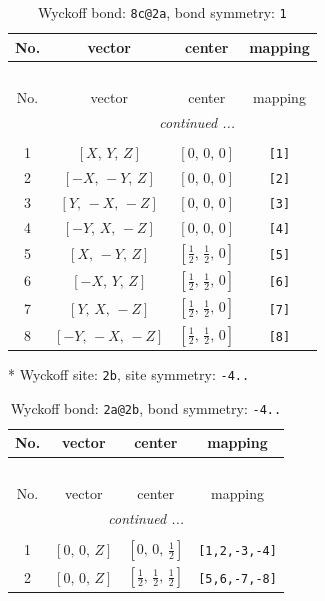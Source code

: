 \documentclass[fleqn,8pt]{jsarticle}
\begin{document}
\renewcommand{\arraystretch}{1.2}
\begin{longtable}{cccc}
\caption{Wyckoff bond: {\tt 8c@2a}, bond symmetry: {\tt 1}}
 \\
 \hline \hline
No. & vector & center & mapping \\ \hline \endfirsthead

\multicolumn{3}{l}{\tablename\ \thetable{}} \\
 \hline \hline
No. & vector & center & mapping \\ \hline \endhead

 \hline \hline
\multicolumn{3}{r}{\footnotesize\it continued ...} \\ \endfoot

 \hline \hline
\multicolumn{3}{r}{} \\ \endlastfoot

1 & $\left[ X,\, Y,\, Z \right]$ & $\left[ 0,\, 0,\, 0 \right]$ & {\tt [1]} \\ \hline
2 & $\left[ - X,\, - Y,\, Z \right]$ & $\left[ 0,\, 0,\, 0 \right]$ & {\tt [2]} \\ \hline
3 & $\left[ Y,\, - X,\, - Z \right]$ & $\left[ 0,\, 0,\, 0 \right]$ & {\tt [3]} \\ \hline
4 & $\left[ - Y,\, X,\, - Z \right]$ & $\left[ 0,\, 0,\, 0 \right]$ & {\tt [4]} \\ \hline
5 & $\left[ X,\, - Y,\, Z \right]$ & $\left[ \frac{1}{2},\, \frac{1}{2},\, 0 \right]$ & {\tt [5]} \\ \hline
6 & $\left[ - X,\, Y,\, Z \right]$ & $\left[ \frac{1}{2},\, \frac{1}{2},\, 0 \right]$ & {\tt [6]} \\ \hline
7 & $\left[ Y,\, X,\, - Z \right]$ & $\left[ \frac{1}{2},\, \frac{1}{2},\, 0 \right]$ & {\tt [7]} \\ \hline
8 & $\left[ - Y,\, - X,\, - Z \right]$ & $\left[ \frac{1}{2},\, \frac{1}{2},\, 0 \right]$ & {\tt [8]} \\
\end{longtable}
* Wyckoff site: {\tt 2b}, site symmetry: {\tt -4..}
\renewcommand{\arraystretch}{1.2}
\begin{longtable}{cccc}
\caption{Wyckoff bond: {\tt 2a@2b}, bond symmetry: {\tt -4..}}
 \\
 \hline \hline
No. & vector & center & mapping \\ \hline \endfirsthead

\multicolumn{3}{l}{\tablename\ \thetable{}} \\
 \hline \hline
No. & vector & center & mapping \\ \hline \endhead

 \hline \hline
\multicolumn{3}{r}{\footnotesize\it continued ...} \\ \endfoot

 \hline \hline
\multicolumn{3}{r}{} \\ \endlastfoot

1 & $\left[ 0,\, 0,\, Z \right]$ & $\left[ 0,\, 0,\, \frac{1}{2} \right]$ & {\tt [1,2,-3,-4]} \\ \hline
2 & $\left[ 0,\, 0,\, Z \right]$ & $\left[ \frac{1}{2},\, \frac{1}{2},\, \frac{1}{2} \right]$ & {\tt [5,6,-7,-8]} \\
\end{longtable}
\end{document}
